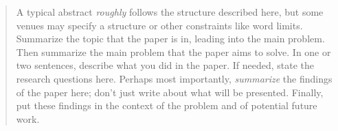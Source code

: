 \begin{abstract}
  A typical abstract \emph{roughly} follows the structure described here,
  but some venues may specify a structure or other constraints like word limits.
  Summarize the topic that the paper is in, leading into the main problem. Then
  summarize the main problem that the paper aims to solve. In one or two
  sentences, describe what you did in the paper. If needed, state the research
  questions here. Perhaps most importantly, \emph{summarize} the findings of the
  paper here; don't just write about what will be presented. Finally, put these
  findings in the context of the problem and of potential future work.
\end{abstract}
